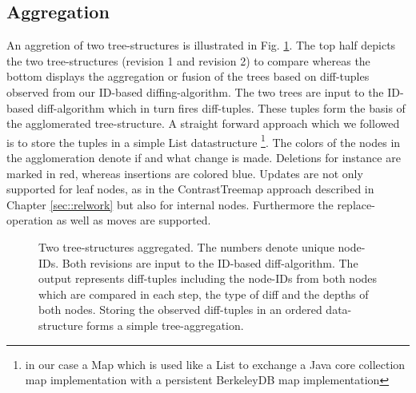 \subsection{Aggregation}\label{subsec::aggregation}
An aggretion of two tree-structures is illustrated in Fig. \ref{fig:aggregation}. The top half depicts the two tree-structures (revision 1 and revision 2) to compare whereas the bottom displays the aggregation or fusion of the trees based on diff-tuples observed from our ID-based diffing-algorithm. The two trees are input to the ID-based diff-algorithm which in turn fires diff-tuples. These tuples form the basis of the agglomerated tree-structure. A straight forward approach which we followed is to store the tuples in a simple List datastructure \footnote{in our case a Map which is used like a List to exchange a Java core collection map implementation with a persistent BerkeleyDB map implementation}. The colors of the nodes in the agglomeration denote if and what change is made. Deletions for instance are marked in red, whereas insertions are colored blue. Updates are not only supported for leaf nodes, as in the ContrastTreemap approach described in Chapter \ref{sec::relwork} but also for internal nodes. Furthermore the replace-operation as well as moves are supported. %

\begin{figure}[tb]
\caption{\label{fig:aggregation} Two tree-structures aggregated. The numbers denote unique node-IDs. Both revisions are input to the ID-based diff-algorithm. The output represents diff-tuples including the node-IDs from both nodes which are compared in each step, the type of diff and the depths of both nodes. Storing the observed diff-tuples in an ordered data-structure forms a simple tree-aggregation.}
\end{figure} 

